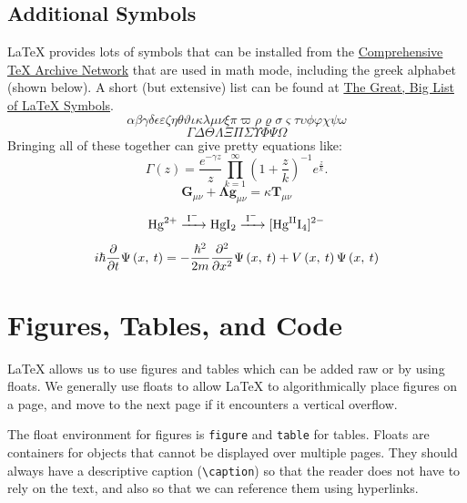 \documentclass[11pt, twoside]{article}
\begin{document}
\subsection{Additional Symbols}
\LaTeX{} provides lots of symbols that can be installed from the \href{https://ctan.org}{Comprehensive TeX Archive Network} that are used in math mode, including the greek alphabet (shown below). A short (but extensive) list can be found at \href{https://www.rpi.edu/dept/arc/training/latex/LaTeX_symbols.pdf}{The Great, Big List of \LaTeX{} Symbols}.
\begin{equation*}
    \alpha \beta \gamma \delta \epsilon \varepsilon \zeta \eta \theta \vartheta \iota \kappa \lambda \mu \nu \xi \pi \varpi \rho \varrho \sigma \varsigma \tau \upsilon \phi \varphi \chi \psi \omega
\end{equation*}
\begin{equation*}
    \Gamma \Delta \Theta \Lambda \Xi \Pi \Sigma \Upsilon \Phi \Psi \Omega
\end{equation*}
Bringing all of these together can give pretty equations like:
\begin{equation*}
    \Gamma\left( z \right) = \frac{e^{-\gamma z}}{z} \prod_{k = 1}^\infty \left( 1 + \frac{z}{k} \right)^{-1} e^{\frac{z}{k}}.
\end{equation*}
\begin{equation*}
    \symbf{G}_{\mu \nu} + \symbf{\Lambda} \symbf{g}_{\mu \nu} = \kappa \symbf{T}_{\mu \nu}
\end{equation*}
\begin{equation*}
    \ce{Hg^2+ ->[I-] HgI2 ->[I-] [Hg^{II}I4]^2-}
\end{equation*}
\begin{equation*}
    i \hbar \pdv{}{t} \Psi\left( x,\: t \right) = -\frac{\hbar^2}{2m} \pdv[order=2]{}{x} \Psi\left( x,\: t \right) + V\left( x,\: t \right) \Psi\left( x,\: t \right)
\end{equation*}
\newpage
\section{Figures, Tables, and Code}
\LaTeX{} allows us to use figures and tables which can be added raw or by using floats.
We generally use floats to allow \LaTeX{} to algorithmically place figures on a page, and
move to the next page if it encounters a vertical overflow.

The float environment for figures is \lstinline{figure} and \lstinline{table} for tables.
Floats are containers for objects that cannot be displayed over multiple pages.
They should always have a descriptive caption (\lstinline{\caption}) so that the reader does not have to rely on the text, and also so that we can reference them using hyperlinks.
\end{document}
